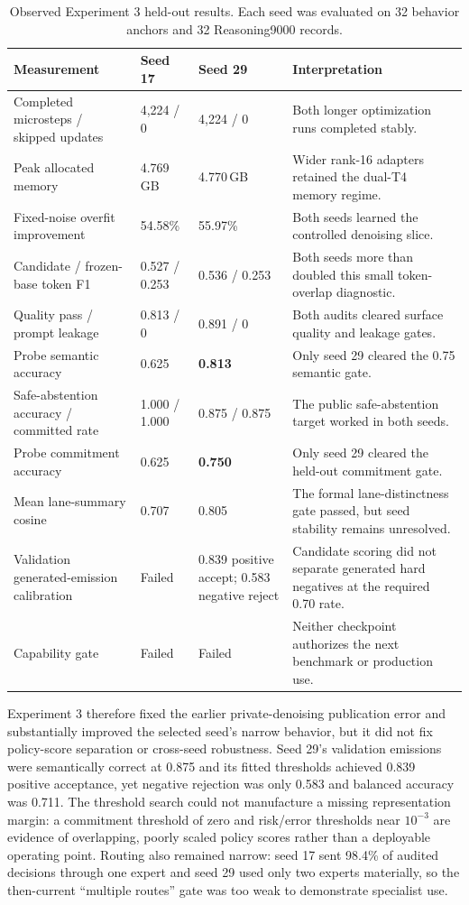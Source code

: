 \documentclass[10pt,a4paper]{article}
\newcommand{\fail}[1]{\textcolor{failred}{#1}}
\begin{document}
\begin{table}[htbp]
\caption{Observed Experiment 3 held-out results. Each seed was evaluated on 32
behavior anchors and 32 Reasoning9000 records.}
\label{tab:study3}
\centering\footnotesize
\begin{tabularx}{\textwidth}{@{}>{\raggedright\arraybackslash}p{}llX@{}}
\toprule
\textbf{Measurement} & \textbf{Seed 17} & \textbf{Seed 29} & \textbf{Interpretation} \\
\midrule
Completed microsteps / skipped updates & 4{,}224 / 0 & 4{,}224 / 0 & Both longer optimization runs completed stably. \\
Peak allocated memory & 4.769\,GB & 4.770\,GB & Wider rank-16 adapters retained the dual-T4 memory regime. \\
Fixed-noise overfit improvement & 54.58\% & 55.97\% & Both seeds learned the controlled denoising slice. \\
Candidate / frozen-base token F1 & 0.527 / 0.253 & 0.536 / 0.253 & Both seeds more than doubled this small token-overlap diagnostic. \\
Quality pass / prompt leakage & 0.813 / 0 & 0.891 / 0 & Both audits cleared surface quality and leakage gates. \\
Probe semantic accuracy & 0.625 & \textbf{0.813} & Only seed 29 cleared the 0.75 semantic gate. \\
Safe-abstention accuracy / committed rate & 1.000 / 1.000 & 0.875 / 0.875 & The public safe-abstention target worked in both seeds. \\
Probe commitment accuracy & 0.625 & \textbf{0.750} & Only seed 29 cleared the held-out commitment gate. \\
Mean lane-summary cosine & 0.707 & 0.805 & The formal lane-distinctness gate passed, but seed stability remains unresolved. \\
Validation generated-emission calibration & Failed & 0.839 positive accept; \fail{0.583} negative reject & Candidate scoring did not separate generated hard negatives at the required 0.70 rate. \\
Capability gate & Failed & Failed & Neither checkpoint authorizes the next benchmark or production use. \\
\bottomrule
\end{tabularx}
\end{table}

Experiment 3 therefore fixed the earlier private-denoising publication error and
substantially improved the selected seed's narrow behavior, but it did not fix
policy-score separation or cross-seed robustness. Seed 29's validation
emissions were semantically correct at 0.875 and its fitted thresholds
achieved 0.839 positive acceptance, yet negative rejection was only 0.583 and
balanced accuracy was 0.711. The threshold search could not manufacture a
missing representation margin: a commitment threshold of zero and risk/error
thresholds near $10^{-3}$ are evidence of overlapping, poorly scaled policy
scores rather than a deployable operating point. Routing also remained narrow:
seed 17 sent 98.4\% of audited decisions through one expert and seed 29
used only two experts materially, so the then-current ``multiple routes''
gate was too weak to demonstrate specialist use.
\end{document}
